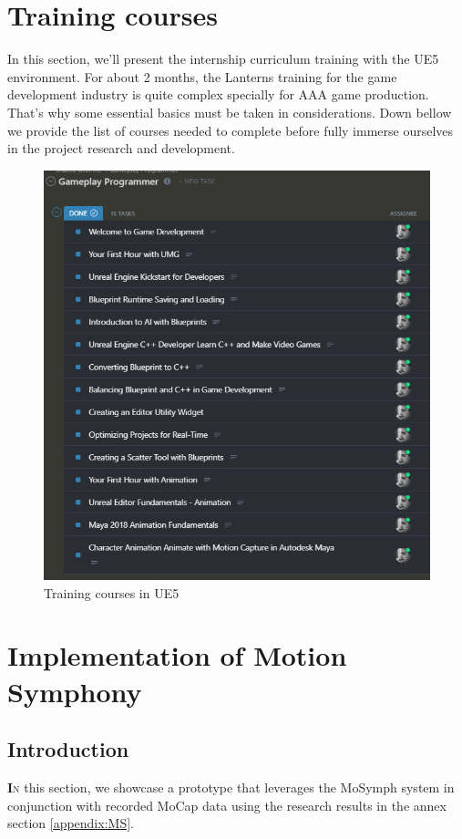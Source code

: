 \documentclass[12pt]{book}
\begin{document}
\section{Training courses}
In this section, we'll present the internship curriculum training with the UE5 environment.
For about 2 months, the Lanterns training for the game development industry is quite complex specially for AAA game production. That's why some essential basics must be taken in considerations. Down bellow we provide the list of courses needed to complete before fully immerse ourselves in the project research and development.
\begin{figure}[!h]
    \centering
    \includegraphics[scale=0.7]{./Figures/formation.png}
    \caption{Training courses in UE5}
    \label{Training courses in UE5}
\end{figure}
\newpage
\section{Implementation of Motion Symphony}
\subsection{Introduction} 
\lettrine[findent=1pt]{\textbf{I}}{n} this section, we showcase a prototype that leverages the MoSymph system in conjunction with recorded MoCap data using the research results in the annex section \ref{appendix:MS}.
\end{document}
